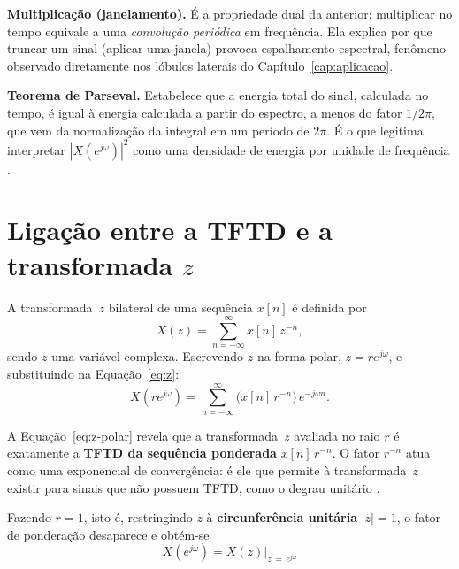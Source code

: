 \documentclass[
    12pt,
    openright,
    oneside,
    a4paper,
    chapter=TITLE,
    section=TITLE,
    brazil
]{abntex2}
\begin{document}
\begin{alineas}
\item \textbf{Multiplicação (janelamento).} É a propriedade dual da anterior:
multiplicar no tempo equivale a uma \emph{convolução periódica} em frequência. Ela
explica por que truncar um sinal (aplicar uma janela) provoca espalhamento espectral,
fenômeno observado diretamente nos lóbulos laterais do Capítulo~\ref{cap:aplicacao}.

\item \textbf{Teorema de Parseval.} Estabelece que a energia total do sinal, calculada
no tempo, é igual à energia calculada a partir do espectro, a menos do fator
$1/2\pi$, que vem da normalização da integral em um período de $2\pi$. É o que legitima
interpretar $|X(e^{j\omega})|^2$ como uma densidade de energia por unidade de frequência
\cite{oppenheim2013}.
\end{alineas}

\vspace{1cm}

\chapter{Ligação entre a TFTD e a transformada \texorpdfstring{$z$}{z}}
\label{cap:z}

A transformada~$z$ bilateral de uma sequência $x[n]$ é definida por
\begin{equation}
    X(z) = \sum_{n=-\infty}^{\infty} x[n]\,z^{-n},
    \label{eq:z}
\end{equation}
sendo $z$ uma variável complexa. Escrevendo $z$ na forma polar, $z = r e^{j\omega}$,
e substituindo na Equação~\eqref{eq:z}:
\begin{equation}
    X(re^{j\omega}) = \sum_{n=-\infty}^{\infty}
        \big(x[n]\,r^{-n}\big)\,e^{-j\omega n}.
    \label{eq:z-polar}
\end{equation}

A Equação~\eqref{eq:z-polar} revela que a transformada~$z$ avaliada no raio $r$ é
exatamente a \textbf{TFTD da sequência ponderada} $x[n]\,r^{-n}$. O fator $r^{-n}$ atua
como uma exponencial de convergência: é ele que permite à transformada~$z$ existir para
sinais que não possuem TFTD, como o degrau unitário \cite{oppenheim1999}.

Fazendo $r = 1$, isto é, restringindo $z$ à \textbf{circunferência unitária}
$|z| = 1$, o fator de ponderação desaparece e obtém-se
\begin{equation}
    \boxed{\;X(e^{j\omega}) = X(z)\Big|_{z\,=\,e^{j\omega}}\;}
    \label{eq:ligacao}
\end{equation}
\end{document}
